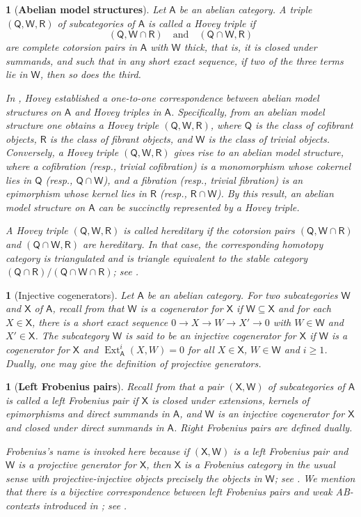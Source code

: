 \documentclass{amsart}
\theoremstyle{bfupright head,slanted body}
\theoremstyle{bfupright head,upright body}
\newtheorem{bfhpg}[res]{}               \newtheorem*{bfhpg*}{}
\theoremstyle{fixed bf head,slanted body}
\theoremstyle{fixed bf head,upright body}
\theoremstyle{numbered paragraph}
\numberwithin{equation}{res}
\newcommand{\Ext}[4][]{\operatorname{Ext}_{#1}^{#2}(#3,#4)}
\newcommand{\A}{\mathsf{A}}
\newcommand{\R}{\mathsf{R}}
\newcommand{\X}{\mathsf{X}}
\newcommand{\W}{\mathsf{W}}
\newcommand{\Q}{\mathsf{Q}}
\begin{document}
\begin{bfhpg}[\bf Abelian model structures]
Let $\A$ be an abelian category. A triple $(\Q,\W,\R)$ of subcategories of $\A$ is called a \emph{Hovey triple} if
 \[
 (\Q,\W\cap \R) \quad \text{and} \quad (\Q\cap\W, \R)
 \]
are complete cotorsion pairs in $\A$ with $\W$ thick, that is, it is closed under summands, and such that in any short exact sequence, if two of the three terms lie in $\W$, then so does the third.

In \cite{Ho02}, Hovey established a one-to-one correspondence between abelian model structures on $\A$ and Hovey triples in $\A$. Specifically, from an abelian model structure one obtains a Hovey triple $(\Q, \W, \R)$, where $\Q$ is the class of cofibrant objects, $\R$ is the class of fibrant objects, and $\W$ is the class of trivial objects. Conversely, a Hovey triple $(\Q, \W, \R)$ gives rise to an abelian model structure, where a cofibration (resp., trivial cofibration) is a monomorphism whose cokernel lies in $\Q$ (resp., $\Q\cap\W$), and a fibration (resp., trivial fibration) is an epimorphism whose kernel lies in $\R$ (resp., $\R\cap\W$). By this result, an abelian model structure on $\A$ can be succinctly represented by a Hovey triple.

A Hovey triple $(\Q, \W, \R)$ is called \emph{hereditary} if the cotorsion pairs $(\Q, \W\cap\R)$ and $(\Q\cap\W, \R)$ are hereditary. In that case, the corresponding homotopy category is triangulated and is triangle equivalent to the stable category $(\Q\cap\R)/(\Q\cap\W\cap \R)$; see \cite{Gil162}.
\end{bfhpg}

\begin{bfhpg}[Injective cogenerators]
Let $\A$ be an abelian category. For two subcategories $\W$ and $\X$ of $\A$, recall from \cite{MAsROB89} that $\W$ is a \emph{cogenerator} for $\X$ if $\W\subseteq\X$ and for each $X\in\X$, there is a short exact sequence $0 \to X \to W \to X' \to 0$ with $W\in\W$ and $X'\in\X$. The subcategory $\W$ is said to be an \emph{injective cogenerator} for $\X$ if $\W$ is a cogenerator for $\X$ and $\Ext[\A]{i}{X}{W}=0$ for all $X\in\X$, $W\in\W$ and $i\geqslant1$. Dually, one may give the definition of \emph{projective generators}.
\end{bfhpg}

\begin{bfhpg}[\bf Left Frobenius pairs]\label{fp-def}
Recall from \cite{BMPS19} that a pair $(\X,\W)$ of subcategories of $\A$ is called a \emph{left Frobenius pair} if $\X$ is closed under extensions, kernels of epimorphisms and direct summands in $\A$, and $\W$ is an injective cogenerator for $\X$ and closed under direct summands in $\A$.
\emph{Right Frobenius pairs} are defined dually.


Frobenius's name is invoked here because if $(\X,\W)$ is a left Frobenius pair and $\W$ is a projective generator for $\X$, then $\X$ is a Frobenius category in the usual sense with projective-injective objects precisely the objects in $\W$; see \cite[Remark 2.6]{BMPS19}. We mention that there is a bijective correspondence between left Frobenius pairs and weak AB-contexts introduced in \cite{MAsROB89}; see \cite[Theorem 5.4]{BMPS19}.
\end{bfhpg}
\end{document}
